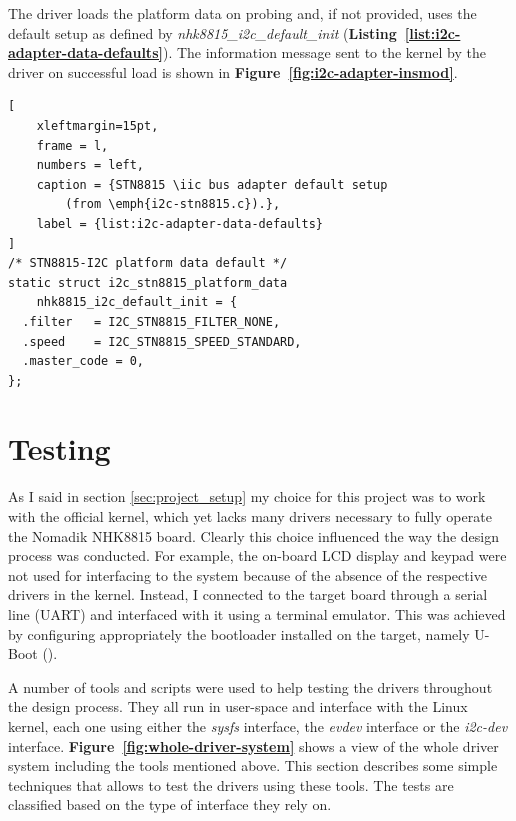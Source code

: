 \documentclass[a4paper,10pt]{article}
\newcommand{\iic}{I\textsuperscript{2}C }
\newcommand{\reff}[1]{\textbf{Figure~\ref{#1}}}
\newcommand{\refl}[1]{\textbf{Listing~\ref{#1}}}
\begin{document}
\begin{multicols}{2}
The driver loads the platform data on probing and, if not provided, uses the 
default setup as defined by \emph{nhk8815\_i2c\_default\_init} 
(\refl{list:i2c-adapter-data-defaults}).
The information message sent to the kernel by the driver on successful load is
shown in \reff{fig:i2c-adapter-insmod}.

\begin{lstlisting}[
	xleftmargin=15pt,
	frame = l,
	numbers = left,
	caption = {STN8815 \iic bus adapter default setup
		(from \emph{i2c-stn8815.c}).},
	label = {list:i2c-adapter-data-defaults}
]
/* STN8815-I2C platform data default */
static struct i2c_stn8815_platform_data
	nhk8815_i2c_default_init = {
  .filter	= I2C_STN8815_FILTER_NONE,
  .speed	= I2C_STN8815_SPEED_STANDARD,
  .master_code = 0,
};
\end{lstlisting}



\section{Testing}
\label{sec:testing}

As I said in section \ref{sec:project_setup} my choice for this project was
to work with the official kernel, which yet lacks many drivers necessary to
fully operate the Nomadik NHK8815 board. Clearly this choice influenced the
way the design process was conducted.
For example, the on-board LCD display and keypad were not used for interfacing
to the system because of the absence of the respective drivers in the kernel.
Instead, I connected to the target board through a serial line (UART) and
interfaced with it using a terminal emulator. This was achieved by configuring
appropriately the bootloader installed on the target, namely U-Boot
(\cite{uboot}).

A number of tools and scripts were used to help testing the drivers throughout
the design process. They all run in user-space and interface with the Linux
kernel, each one using either the \emph{sysfs} interface, the \emph{evdev}
interface or the \emph{i2c-dev} interface.
\reff{fig:whole-driver-system} shows a view of the whole driver
system including the tools mentioned above.
This section describes some simple techniques that allows to test the drivers
using these tools. The tests are classified based on the type of interface 
they rely on.


\end{multicols}
\end{document}
